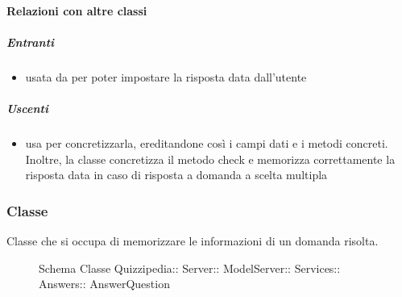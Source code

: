 \paragraph{Relazioni con altre classi}
\subparagraph{Entranti}
\begin{itemize}
\item usata da  per poter impostare la risposta data dall'utente
\end{itemize}
\subparagraph{Uscenti}
\begin{itemize}
\item usa  per concretizzarla, ereditandone così i campi dati e i metodi concreti. Inoltre, la classe concretizza il metodo check e memorizza correttamente la risposta data in caso di risposta a domanda a scelta multipla
\end{itemize}
\subsubsection{Classe }
Classe che si occupa di memorizzare le informazioni di un domanda risolta.
\begin{figure}[H]
\centering
\noindent{}
\caption[Schema Classe AnswerQuestion]{Schema Classe Quizzipedia:: Server:: ModelServer:: Services:: Answers:: AnswerQuestion}
\end{figure}
